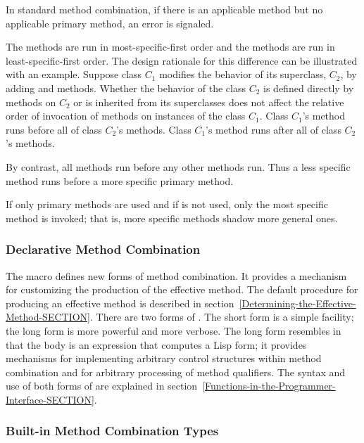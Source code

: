 In standard method combination, if there is an applicable method
but no applicable primary method, an error is signaled.

The  methods are run in most-specific-first order and
the  methods are run in least-specific-first order.  The
design rationale for this difference can be illustrated with an
example.  Suppose class $C_1$ modifies the behavior of its
superclass, $C_2$, by adding  and 
methods. Whether the behavior of the class $C_2$ is defined
directly by methods on $C_2$ or is inherited from its superclasses
does not affect the relative order of invocation of methods on
instances of the class $C_1$.  Class $C_1$'s 
method runs before all of class $C_2$'s methods.  Class $C_1$'s 
method runs after all of class $C_2$'s methods. 

By contrast, all  methods run before any other methods
run.  Thus a less specific  method runs before a more
specific primary method.

If only primary methods are used and if  is not
used, only the most specific method is invoked; that is, more specific
methods shadow more general ones. 

\subsubsection{Declarative Method Combination}

The macro  defines new forms of method
combination.  It provides a mechanism for customizing the production
of the effective method. The default procedure for producing an
effective method is described in
section~\ref{Determining-the-Effective-Method-SECTION}.
There are two forms of 
.  The short form is a simple facility;
the long form is more powerful and more verbose.  The long form
resembles  in that the body is an expression that
computes a Lisp form; it provides mechanisms for implementing
arbitrary control structures within method combination and for
arbitrary processing of method qualifiers.  The syntax and use of both
forms of  are explained in
section~\ref{Functions-in-the-Programmer-Interface-SECTION}.

\subsubsection{Built-in Method Combination Types}
\label{Built-in-Method-Combination-Types-SECTION}

